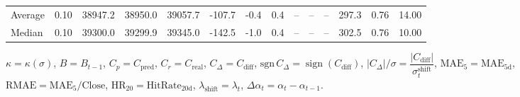 \begin{threeparttable}
{\begin{tabular}{lrrrrrrrrrrrrr}
Average &     0.10 & 38947.2 & 38950.0 & 39057.7 &     -107.7 &                     -0.4 &                 0.4 &         -- &        -- &             -- &            297.3 &            0.76 &                  14.00 \\
 Median &     0.10 & 39300.0 & 39299.9 & 39345.0 &     -142.5 &                     -1.0 &                 0.4 &         -- &        -- &             -- &            302.5 &            0.76 &                  10.00 \\
\bottomrule
\end{tabular}
}
\begin{tablenotes}\footnotesize
\item $\kappa=\kappa(\sigma)$, $B=B_{t-1}$, $C_p=C_{\text{pred}}$, $C_r=C_{\text{real}}$, $C_\Delta=C_{\text{diff}}$, $\mathrm{sgn}\,C_\Delta=\operatorname{sign}(C_{\text{diff}})$, $|C_\Delta|/\sigma=\dfrac{|C_{\text{diff}}|}{\sigma_t^{\text{shift}}}$, $\mathrm{MAE}_5=\mathrm{MAE}_{5\text{d}}$, $\mathrm{RMAE}= \mathrm{MAE}_5 / \text{Close}$, $\mathrm{HR}_{20}=\mathrm{HitRate}_{20\text{d}}$, 
$\lambda_{\text{shift}}=\lambda_t$, 
$\Delta\alpha_t=\alpha_t-\alpha_{t-1}$.
\end{tablenotes}
\end{threeparttable}
\endgroup

